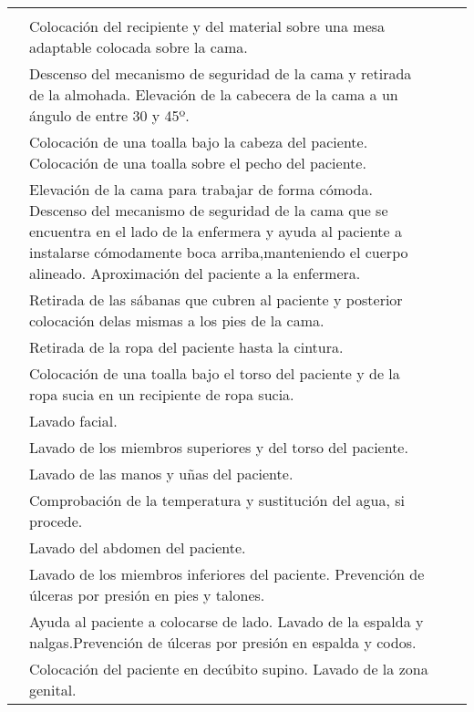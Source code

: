 \begin{landscape}
\begin{longtable}{N{0.15\textwidth}M{0.93\textwidth}|M{0.095\textwidth}M{0.22\textwidth}}
        & & \\  
        & Colocación del recipiente y del material sobre una mesa adaptable colocada sobre la cama.
        & & \\  
        & Descenso del mecanismo de seguridad de la cama y retirada de la almohada. Elevación de la cabecera de la cama a un ángulo de entre 30 y 45º.
        & & \\  
        & Colocación de una toalla bajo la cabeza del paciente. Colocación de una toalla sobre el pecho del paciente.
        & & \\  
        & Elevación de la cama para trabajar de forma cómoda. Descenso del mecanismo de seguridad de la cama que se encuentra en el lado de la enfermera y ayuda al paciente a instalarse cómodamente boca arriba,manteniendo el cuerpo alineado. Aproximación del paciente a la enfermera.
        & & \\  
        & Retirada de las sábanas que cubren al paciente y posterior colocación delas mismas a los pies de la cama.
        & & \\  
        & Retirada de la ropa del paciente hasta la cintura.
        & & \\  
        & Colocación de una toalla bajo el torso del paciente y de la ropa sucia en un recipiente de ropa sucia.
        & & \\  
        & Lavado facial.
        & & \\ 
        & Lavado de los miembros superiores y del torso del paciente.
        & & \\  
        & Lavado de las manos y uñas del paciente.
        & & \\  
        & Comprobación de la temperatura y sustitución del agua, si procede.
        & & \\  
        & Lavado del abdomen del paciente.
        & & \\  
        & Lavado de los miembros inferiores del paciente. Prevención de úlceras por presión en pies y talones.
        & & \\  
        & Ayuda al paciente a colocarse de lado. Lavado de la espalda y nalgas.Prevención de úlceras por presión en espalda y codos.
        & & \\  
        & Colocación del paciente en decúbito supino. Lavado de la zona genital.
        & & \\  

\end{longtable}
\end{landscape}
